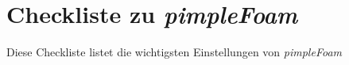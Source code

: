 \chapter{Checkliste zu \textit{pimpleFoam}}

Diese Checkliste listet die wichtigsten Einstellungen von \textit{pimpleFoam}
\\
\\
\begin{Form}

\Square{} 

\end{Form}

\newpage